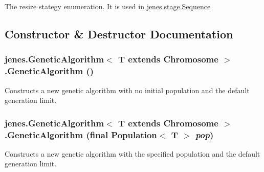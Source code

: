 The resize stategy enumeration. It is used in \hyperlink{}{jenes.stage.Sequence}

\subsection{Constructor \& Destructor Documentation}
\hypertarget{classjenes_1_1_genetic_algorithm_3_01_t_01extends_01_chromosome_01_4_cfda239e0d2154eb26a7be4f6aa1315d}{
\subsubsection[GeneticAlgorithm]{\setlength{\rightskip}{0pt plus 5cm}jenes.GeneticAlgorithm$<$ T extends Chromosome $>$.GeneticAlgorithm ()}}
\label{classjenes_1_1_genetic_algorithm_3_01_t_01extends_01_chromosome_01_4_cfda239e0d2154eb26a7be4f6aa1315d}


Constructs a new genetic algorithm with no initial population and the default generation limit. \hypertarget{classjenes_1_1_genetic_algorithm_3_01_t_01extends_01_chromosome_01_4_ede3d2fbd3c3d1cf04a4e419649cae93}{
\subsubsection[GeneticAlgorithm]{\setlength{\rightskip}{0pt plus 5cm}jenes.GeneticAlgorithm$<$ T extends Chromosome $>$.GeneticAlgorithm (final Population$<$ T $>$ {\em pop})}}
\label{classjenes_1_1_genetic_algorithm_3_01_t_01extends_01_chromosome_01_4_ede3d2fbd3c3d1cf04a4e419649cae93}


Constructs a new genetic algorithm with the specified population and the default generation limit. 

